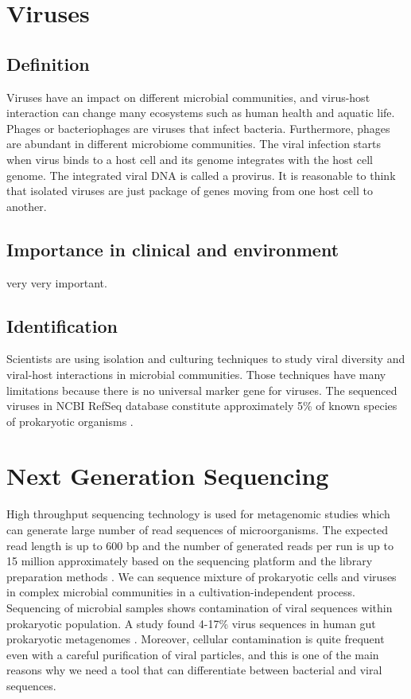 \section{Viruses}


\subsection{Definition}

Viruses have an impact on different microbial communities, and virus-host interaction can change many ecosystems such as human health and aquatic life. Phages or bacteriophages are viruses that infect bacteria. Furthermore, phages are abundant in different microbiome communities. The viral infection starts when virus binds to a host cell and its genome integrates with the host cell genome. The integrated viral DNA is called a provirus. It is reasonable to think that isolated viruses are just package of genes moving from one host cell to another.

\subsection{Importance in clinical and environment}

very very important.

\subsection{Identification}

 Scientists are using isolation and culturing techniques to study viral diversity and viral-host interactions in microbial communities. Those techniques have many limitations because there is no universal marker gene for viruses. The sequenced viruses in NCBI RefSeq database constitute approximately 5\% of known species of prokaryotic organisms \cite{roux2015viral}.

\section{Next Generation Sequencing}

High throughput sequencing technology is used for metagenomic studies which can generate large number of read  sequences of microorganisms. The expected read length is up to 600 bp and the number of generated reads per run is up to 15 million approximately based on the sequencing platform and the library preparation methods \cite{allali2017comparison}. We can sequence mixture of prokaryotic cells and viruses in complex microbial communities in a cultivation-independent process. Sequencing of microbial samples shows contamination of viral sequences within prokaryotic population. A study found 4-17\% virus sequences in human gut prokaryotic metagenomes \cite{minot2011human}. Moreover, cellular contamination is quite frequent even with a careful purification of viral particles, and this is one of the main reasons why we need a tool that can differentiate between bacterial and viral sequences.

